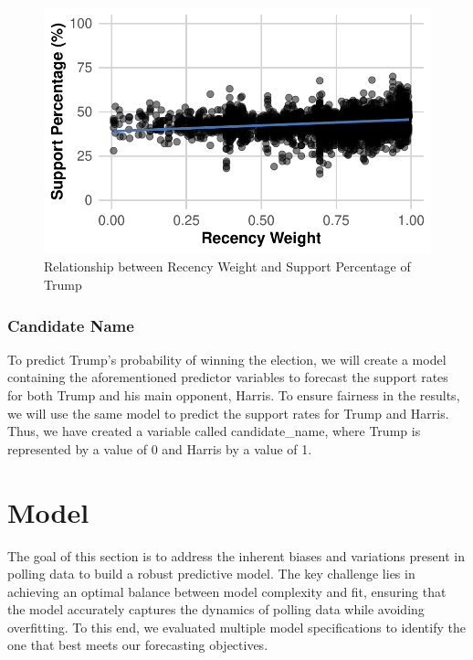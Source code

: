 \documentclass[
  letterpaper,
  DIV=11,
  numbers=noendperiod]{scrartcl}
\begin{document}
\begin{figure}

{\centering \includegraphics{Insights-and-Predictions-for-the-U.S.-Election_files/figure-pdf/fig-recency-1.pdf}

}

\caption{\label{fig-recency}Relationship between Recency Weight and
Support Percentage of Trump}

\end{figure}

\hypertarget{candidate-name}{%
\subsubsection{Candidate Name}\label{candidate-name}}

To predict Trump's probability of winning the election, we will create a
model containing the aforementioned predictor variables to forecast the
support rates for both Trump and his main opponent, Harris. To ensure
fairness in the results, we will use the same model to predict the
support rates for Trump and Harris. Thus, we have created a variable
called candidate\_name, where Trump is represented by a value of 0 and
Harris by a value of 1.

\hypertarget{sec-model}{%
\section{Model}\label{sec-model}}

The goal of this section is to address the inherent biases and
variations present in polling data to build a robust predictive model.
The key challenge lies in achieving an optimal balance between model
complexity and fit, ensuring that the model accurately captures the
dynamics of polling data while avoiding overfitting. To this end, we
evaluated multiple model specifications to identify the one that best
meets our forecasting objectives.
\end{document}
